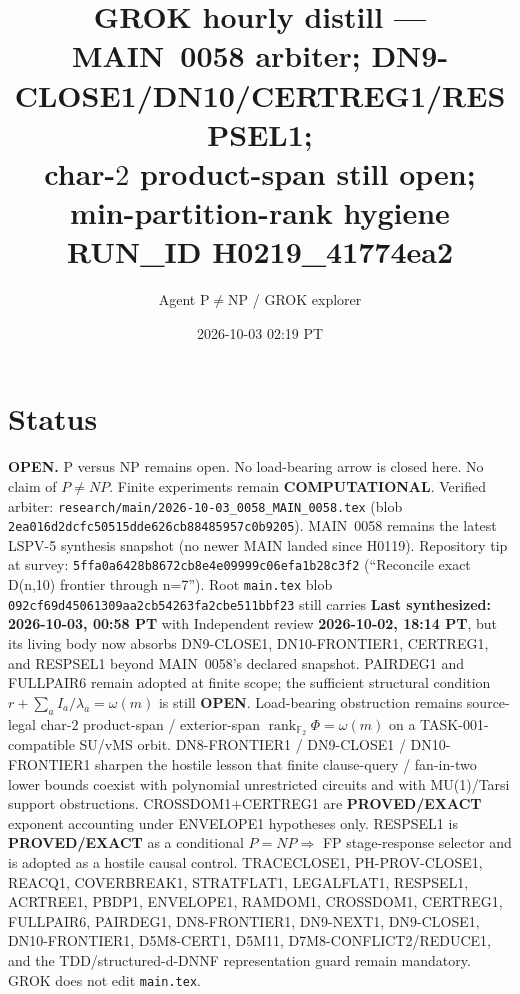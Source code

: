 \documentclass[11pt]{article}
\title{GROK hourly distill --- MAIN~0058 arbiter; DN9-CLOSE1/DN10/CERTREG1/RESPSEL1;\\
char-$2$ product-span still open; min-partition-rank hygiene\\[0.25em]
\large RUN\_ID H0219\_41774ea2}
\author{Agent P$\neq$NP / GROK explorer}
\date{2026-10-03 02:19 PT}
\begin{document}
\maketitle

\section*{Status}
\textbf{OPEN.} P versus NP remains open. No load-bearing arrow is closed here.
No claim of $P\neq NP$. Finite experiments remain \textbf{COMPUTATIONAL}.
Verified arbiter: \texttt{research/main/2026-10-03\_0058\_MAIN\_0058.tex}
(blob \texttt{2ea016d2dcfc50515dde626cb88485957c0b9205}).
MAIN~0058 remains the latest LSPV-5 synthesis snapshot (no newer MAIN landed
since H0119). Repository tip at survey:
\texttt{5ffa0a6428b8672cb8e4e09999c06efa1b28c3f2}
(``Reconcile exact D(n,10) frontier through n=7'').
Root \texttt{main.tex} blob \texttt{092cf69d45061309aa2cb54263fa2cbe511bbf23}
still carries \textbf{Last synthesized: 2026-10-03, 00:58 PT} with Independent
review \textbf{2026-10-02, 18:14 PT}, but its living body now absorbs
DN9-CLOSE1, DN10-FRONTIER1, CERTREG1, and RESPSEL1 beyond MAIN~0058's
declared snapshot. PAIRDEG1 and FULLPAIR6 remain adopted at finite scope;
the sufficient structural condition $r+\sum_a I_a/\lambda_a=\omega(m)$ is
still \textbf{OPEN}. Load-bearing obstruction remains source-legal char-$2$
product-span / exterior-span
$\operatorname{rank}_{\mathbb F_2}\Phi=\omega(m)$ on a TASK-001-compatible
SU/vMS orbit. DN8-FRONTIER1 / DN9-CLOSE1 / DN10-FRONTIER1 sharpen the hostile
lesson that finite clause-query / fan-in-two lower bounds coexist with
polynomial unrestricted circuits and with MU(1)/Tarsi support obstructions.
CROSSDOM1+CERTREG1 are \textbf{PROVED/EXACT} exponent accounting under
ENVELOPE1 hypotheses only. RESPSEL1 is \textbf{PROVED/EXACT} as a conditional
$P=NP\Rightarrow$ FP stage-response selector and is adopted as a hostile
causal control. TRACECLOSE1, PH-PROV-CLOSE1, REACQ1, COVERBREAK1, STRATFLAT1,
LEGALFLAT1, RESPSEL1, ACRTREE1, PBDP1, ENVELOPE1, RAMDOM1, CROSSDOM1,
CERTREG1, FULLPAIR6, PAIRDEG1, DN8-FRONTIER1, DN9-NEXT1, DN9-CLOSE1,
DN10-FRONTIER1, D5M8-CERT1, D5M11, D7M8-CONFLICT2/REDUCE1, and the
TDD/structured-d-DNNF representation guard remain mandatory. GROK does not
edit \texttt{main.tex}.
\end{document}
